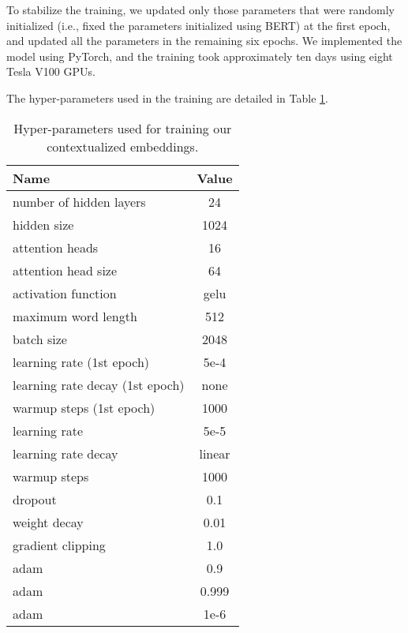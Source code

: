 \documentclass[11pt,a4paper]{article}
\begin{document}
To stabilize the training, we updated only those parameters that were randomly initialized (i.e., fixed the parameters initialized using BERT) at the first epoch, and updated all the parameters in the remaining six epochs.
We implemented the model using PyTorch, and the training took approximately ten days using eight Tesla V100 GPUs.

The hyper-parameters used in the training are detailed in Table  \ref{tb:pretraining-config}.

\begin{table}[tbhp]
  \centering
  \begin{tabular}{l|c}
    \hline
    Name                            & Value  \\
    \hline
    number of hidden layers         & 24     \\
    hidden size                     & 1024   \\
    attention heads                 & 16     \\
    attention head size             & 64     \\
    activation function             & gelu   \\
    maximum word length             & 512    \\
    batch size                      & 2048   \\
    learning rate (1st epoch)       & 5e-4   \\
    learning rate decay (1st epoch) & none   \\
    warmup steps (1st epoch)        & 1000   \\
    learning rate                   & 5e-5   \\
    learning rate decay             & linear \\
    warmup steps                    & 1000   \\
    dropout                         & 0.1    \\
    weight decay                    & 0.01   \\
    gradient clipping               & 1.0    \\
    adam                   & 0.9    \\
    adam                   & 0.999  \\
    adam                  & 1e-6   \\
    \hline
  \end{tabular}
  \caption{Hyper-parameters used for training our contextualized embeddings.}
  \label{tb:pretraining-config}
\end{table}
\end{document}
